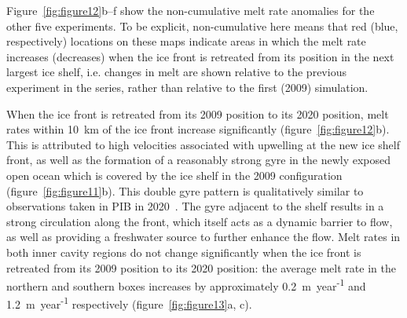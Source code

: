 \documentclass[draft]{agujournal2019}
\begin{document}
Figure~\ref{fig:figure12}b--f show the non-cumulative melt rate anomalies for the other five experiments. To be explicit, non-cumulative here means that red (blue, respectively) locations on these maps indicate areas in which the melt rate increases (decreases) when the ice front is retreated from its position in the next largest ice shelf, i.e. changes in melt are shown relative to the previous experiment in the series, rather than relative to the first (2009) simulation.

When the ice front is retreated from its 2009 position to its 2020 position, melt rates within 10~km of the ice front increase significantly (figure~\ref{fig:figure12}b). This is attributed to high velocities associated with upwelling at the new ice shelf front, as well as the formation of a reasonably strong gyre in the newly exposed open ocean which is covered by the ice shelf in the 2009 configuration (figure~\ref{fig:figure11}b). This double gyre pattern is qualitatively similar to observations taken in PIB in 2020~\cite{Yoon2021}. The gyre adjacent to the shelf results in a strong circulation along the front, which itself acts as a dynamic barrier to flow, as well as providing a freshwater source to further enhance the flow. Melt rates in both inner cavity regions do not change significantly when the ice front is retreated from its 2009 position to its 2020 position: the average melt rate in the northern and southern boxes increases by approximately 0.2~m~year\textsuperscript{-1} and 1.2~m~year\textsuperscript{-1} respectively (figure~\ref{fig:figure13}a, c).
\end{document}
